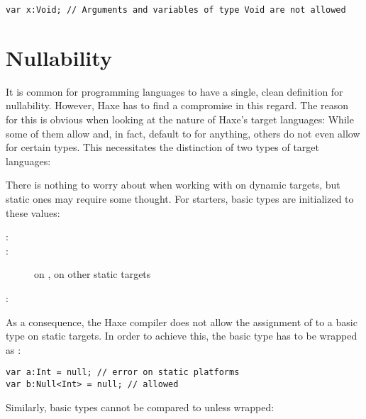 \documentclass{haxe}
\begin{document}
\begin{lstlisting}
var x:Void; // Arguments and variables of type Void are not allowed
\end{lstlisting}




\section{Nullability}
\label{types-nullability}


It is common for programming languages to have a single, clean definition for nullability. However, Haxe has to find a compromise in this regard. The reason for this is obvious when looking at the nature of Haxe's target languages: While some of them allow and, in fact, default to  for anything, others do not even allow  for certain types. This necessitates the distinction of two types of target languages:


There is nothing to worry about when working with  on dynamic targets, but static ones may require some thought. For starters, basic types are initialized to these values:

\begin{description}
	\item[:] 
	\item[:]  on ,  on other static targets
	\item[:] 
\end{description}
As a consequence, the Haxe compiler does not allow the assignment of  to a basic type on static targets. In order to achieve this, the basic type has to be wrapped as :

\begin{lstlisting}
var a:Int = null; // error on static platforms
var b:Null<Int> = null; // allowed
\end{lstlisting}
Similarly, basic types cannot be compared to  unless wrapped:
\end{document}
